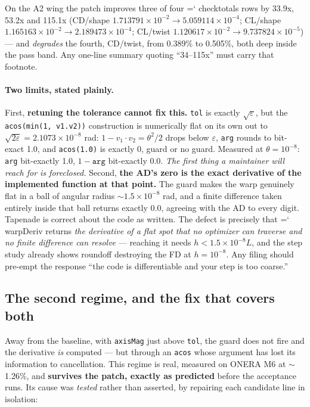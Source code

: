 \documentclass[11pt,a4paper]{article}
\newcommand{\artifact}[1]{{\small\ttfamily\hyphenchar\font=`\-\relax
  \def\_{\textunderscore\allowbreak}#1}}
\begin{document}
On the A2 wing the patch improves three of four \artifact{check\_totals} rows by 33.9x, 53.2x
and 115.1x (CD/shape \(1.713791\times10^{-2}\rightarrow5.059114\times10^{-4}\); CL/shape
\(1.165163\times10^{-2}\rightarrow2.189473\times10^{-4}\); CL/twist
\(1.120617\times10^{-2}\rightarrow9.737824\times10^{-5}\)) --- and \emph{degrades} the fourth,
CD/twist, from 0.389\% to 0.505\%, both deep inside the pass band. Any one-line summary
quoting ``34--115x'' must carry that footnote.

\paragraph{Two limits, stated plainly.} First, \textbf{retuning the tolerance cannot fix
this.} \texttt{tol} is exactly \(\sqrt{\varepsilon}\), but the \texttt{acos(min(1, v1.v2))}
construction is numerically flat on its own out to \(\sqrt{2\varepsilon} =
2.1073\times10^{-8}\) rad: \(1-v_1\!\cdot\!v_2 = \theta^2/2\) drops below \(\varepsilon\),
\texttt{arg} rounds to bit-exact 1.0, and \texttt{acos(1.0)} is exactly 0, guard or no guard.
Measured at \(\theta = 10^{-8}\): \texttt{arg} bit-exactly 1.0, \(1-\texttt{arg}\) bit-exactly
0.0. \emph{The first thing a maintainer will reach for is foreclosed.} Second, \textbf{the
AD's zero is the exact derivative of the implemented function at that point.} The guard makes
the warp genuinely flat in a ball of angular radius \(\sim\!1.5\times10^{-8}\) rad, and a
finite difference taken entirely inside that ball returns exactly 0.0, agreeing with the AD to
every digit. Tapenade is correct about the code as written. The defect is precisely that
\artifact{warpDeriv} returns \emph{the derivative of a flat spot that no optimizer can
traverse and no finite difference can resolve} --- reaching it needs
\(h < 1.5\times10^{-8}L\), and the step study already shows roundoff destroying the FD at
\(h = 10^{-8}\). Any filing should pre-empt the response ``the code is differentiable and your
step is too coarse.''

\subsection{The second regime, and the fix that covers both}

Away from the baseline, with \texttt{axisMag} just above \texttt{tol}, the guard does not fire
and the derivative \emph{is} computed --- but through an \texttt{acos} whose argument has lost
its information to cancellation. This regime is real, measured on ONERA M6 at \(\sim\)1.26\%,
and \textbf{survives the patch, exactly as predicted} before the acceptance runs. Its cause
was \emph{tested} rather than asserted, by repairing each candidate line in isolation:
\end{document}
